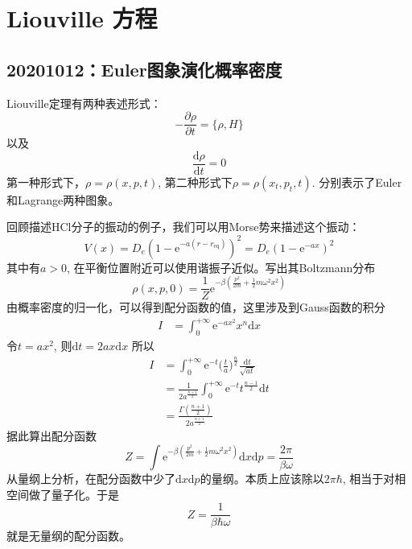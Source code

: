 \chapter{Liouville 方程}

    \section{20201012：Euler图象演化概率密度}

    Liouville定理有两种表述形式：
    \begin{equation*}
        -\frac {\partial \rho}{\partial t} = \{ \rho,H \}
    \end{equation*}
    以及 
    \begin{equation*}
        \frac {\mathrm{d}\rho}{\mathrm{d}t} = 0
    \end{equation*}
    第一种形式下，$\rho = \rho(x, p ,t)$, 第二种形式下$\rho = \rho(x_t,p_t,t)$. 分别表示了Euler和Lagrange两种图象。

    回顾描述HCl分子的振动的例子，我们可以用Morse势来描述这个振动：
    \begin{equation*}
        V(x) = D_e (1- \mathrm{e}^{-a(r-r_\mathrm{eq})})^2 = D_e(1-\mathrm{e}^{-ax})^2
    \end{equation*}
    其中有$a>0$, 在平衡位置附近可以使用谐振子近似。写出其Boltzmann分布
    \begin{equation*}
        \rho(x,p,0) = \frac 1Z \mathrm{e}^{-\beta (\frac {p^2}{2m} + \frac 12 m\omega^2 x^2)} 
    \end{equation*}
    由概率密度的归一化，可以得到配分函数的值，这里涉及到Gauss函数的积分
    \begin{align*}
        I &= \int_0^{+\infty} \mathrm{e}^{-ax^2} x^{n} \mathrm{d}x
    \end{align*}
    令$t = ax^2$, 则$\mathrm{d}t = 2ax\mathrm{d}x$
    所以
    \begin{align*}
    I &= \int_0^{+\infty} \mathrm{e}^{-t} \bigg(\frac ta\bigg)^{\frac n2} \frac {\mathrm{d}t}{\sqrt{at}}\\
    &= \frac 1{2a^{\frac {n+1}2}} \int_0^{+\infty} \mathrm{e}^{-t} t^{\frac {n-1}2} \mathrm{d}t\\
    &= \frac {\Gamma(\frac {n+1}2)}{2a^{\frac {n+1}2}}
    \end{align*}
    据此算出配分函数
    \begin{equation*}
        Z = \int \mathrm{e}^{-\beta (\frac {p^2}{2m} + \frac 12 m\omega^2 x^2)} \mathrm{d}x\mathrm{d}p = \frac {2\pi}{\beta \omega}
    \end{equation*}
    从量纲上分析，在配分函数中少了$\mathrm{d}x\mathrm{d}p$的量纲。本质上应该除以$2\pi\hbar$, 相当于对相空间做了量子化。于是
    \begin{equation*}
        Z = \frac 1{\beta \hbar \omega}
    \end{equation*}
    就是无量纲的配分函数。

